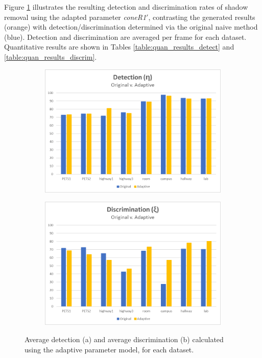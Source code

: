 Figure \ref{fig:bars_hsv_calc} illustrates the resulting detection and discrimination rates of shadow removal using the adapted parameter \textit{coneR1}$'$, contrasting the generated results (orange) with detection/discrimination determined via the original naive method (blue). Detection and discrimination are averaged per frame for each dataset. Quantitative results are shown in Tables \ref{table:quan_results_detect} and \ref{table:quan_results_discrim}.

\begin{figure}
\centering
\begin{subfigure}{.8\linewidth}
  \includegraphics[width=1\linewidth]{figures/model/detect_hsv.jpg}
  \caption{}
\end{subfigure}
\hfill
\begin{subfigure}{.8\linewidth}
  \includegraphics[width=1\linewidth]{figures/model/discrim_hsv.jpg}
  \caption{}
\end{subfigure}

\caption{Average detection (a) and average discrimination (b) calculated using the adaptive parameter model, for each dataset.}
\label{fig:bars_hsv_calc}
\end{figure}

